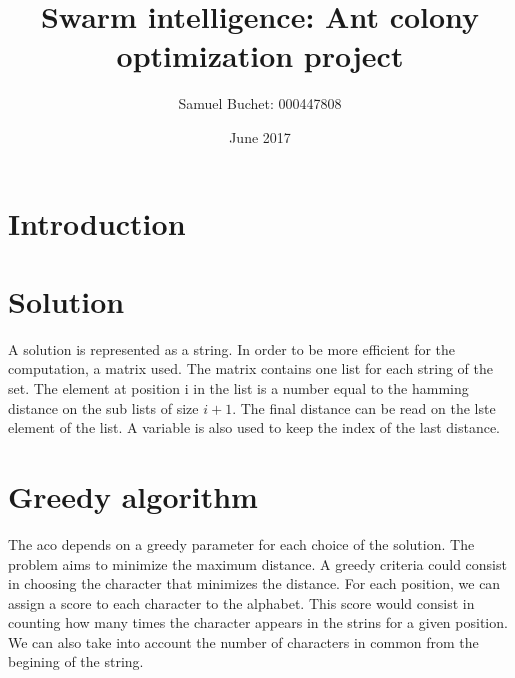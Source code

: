\documentclass{article}
\title{Swarm intelligence: Ant colony optimization project}
\author{Samuel Buchet: 000447808}
\date{June 2017}
\begin{document}
\maketitle

\section{Introduction}

\section{Solution}

A solution is represented as a string.
In order to be more efficient for the computation, a matrix used.
The matrix contains one list for each string of the set.
The element at position i in the list is a number equal to the hamming distance
on the sub lists of size $i+1$.
The final distance can be read on the lste element of the list.
A variable is also used to keep the index of the last distance.

\section{Greedy algorithm}

The aco depends on a greedy parameter for each choice of the solution.
The problem aims to minimize the maximum distance.
A greedy criteria could consist in choosing the character that minimizes the distance.
For each position, we can assign a score to each character to the alphabet.
This score would consist in counting how many times the character appears in the strins for a given position.
We can also take into account the number of characters in common from the begining of the string. 
\end{document}
